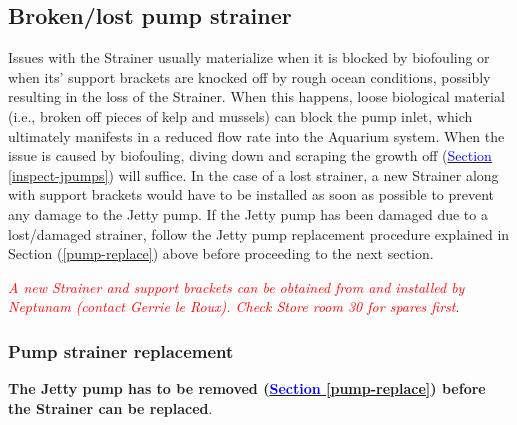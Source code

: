 \documentclass[
  12pt,
]{report}
\begin{document}
\hypertarget{brokenlost-pump-strainer}{%
\subsection{\texorpdfstring{Broken/lost pump strainer
\label{lost-strainer}}{Broken/lost pump strainer }}\label{brokenlost-pump-strainer}}

Issues with the Strainer usually materialize when it is blocked by
biofouling or when its' support brackets are knocked off by rough ocean
conditions, possibly resulting in the loss of the Strainer. When this
happens, loose biological material (i.e., broken off pieces of kelp and
mussels) can block the pump inlet, which ultimately manifests in a
reduced flow rate into the Aquarium system. When the issue is caused by
biofouling, diving down and scraping the growth off
(\ul{\textcolor{blue}{Section \ref{inspect-jpumps}}}) will suffice. In
the case of a lost strainer, a new Strainer along with support brackets
would have to be installed as soon as possible to prevent any damage to
the Jetty pump. If the Jetty pump has been damaged due to a lost/damaged
strainer, follow the Jetty pump replacement procedure explained in
Section (\ul{\textcolor{blue}{\ref{pump-replace}}}) above before
proceeding to the next section.

\emph{\textcolor{red}{A new Strainer and support brackets can be obtained from and installed by Neptunam (contact Gerrie le Roux). Check Store room 30 for spares first}}.

\hypertarget{pump-strainer-replacement}{%
\subsubsection{Pump strainer
replacement}\label{pump-strainer-replacement}}

\textbf{The Jetty pump has to be removed
(\ul{\textcolor{blue}{Section \ref{pump-replace}}}) before the Strainer
can be replaced}.
\end{document}
